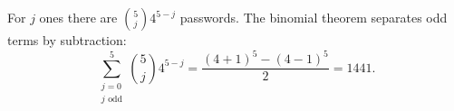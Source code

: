 For $j$ ones there are $\binom5j4^{5-j}$ passwords. The binomial theorem separates odd terms by subtraction:
\[
\sum_{\substack{j=0\\j\text{ odd}}}^5\binom5j4^{5-j}
=\dfrac{(4+1)^5-(4-1)^5}{2}
=\boxed{1441}.
\]
